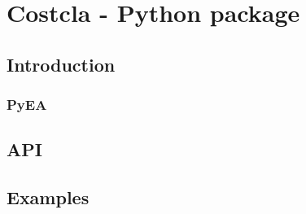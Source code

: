   \chapter{Costcla - Python package}\label{ch:9}
    \section{Introduction}
      \subsection{PyEA}
    \section{API}
    \section{Examples}